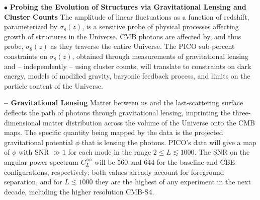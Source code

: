 \documentclass[PICOAPC.tex]{subfiles}
\begin{document}



$\bullet$ {\bf Probing the Evolution of Structures via Gravitational Lensing and Cluster Counts} \hspace{0.1in} \label{sec:gravitationallensing}   The amplitude of linear fluctuations as a function of redshift, parameterized by $\sigma_8(z)$, is a sensitive probe of physical processes affecting growth of structures in the Universe. \ac{CMB} photons are affected by, and thus probe, $\sigma_{8}(z)$ as they traverse the entire Universe. The PICO sub-percent constraints on $\sigma_8(z)$, obtained through measurements of gravitational lensing and -- independently -- using cluster counts, will translate to constraints on dark energy, models of modified gravity, baryonic feedback process, and limits on the particle content of the Universe. 

{\bf -- Gravitational Lensing} \hspace{0.1in} \label{lensing} Matter between us and the last-scattering surface deflects the path of photons through gravitational lensing, imprinting the three-dimensional matter distribution across the volume of the Universe onto the CMB maps. The specific quantity being mapped by the data is the projected gravitational potential $\phi$ that is lensing the photons. 
PICO's data will give a map of $\phi$ with \ac{SNR} $\gg1$ for each mode in the range $2 \leq L \lesssim 1000$. The \ac{SNR} on the angular power spectrum  $C_{L}^{\phi \phi}$ will be 560 and 644 for the baseline and CBE configurations, respectively; both values already account for foreground separation, and for $L \lesssim 1000$ they are the highest of any experiment in the next decade, including the higher resolution CMB-S4. 
\end{document}
